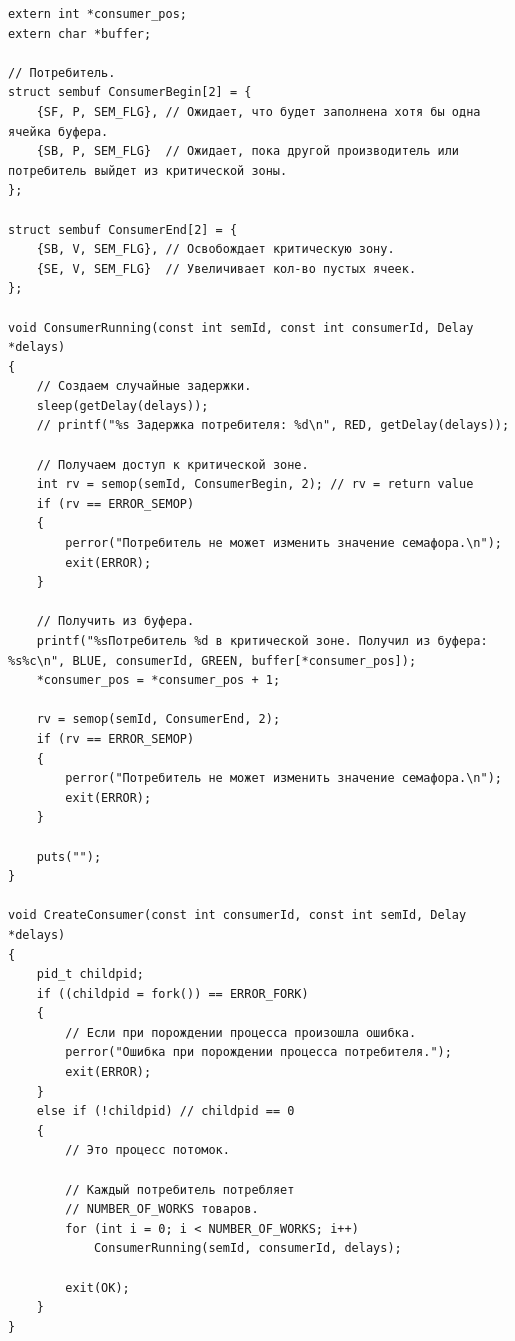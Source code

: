 \begin{lstlisting}[label=some-code,caption=Потребитель]
extern int *consumer_pos;
extern char *buffer;

// Потребитель.
struct sembuf ConsumerBegin[2] = {
	{SF, P, SEM_FLG}, // Ожидает, что будет заполнена хотя бы одна ячейка буфера.
	{SB, P, SEM_FLG}  // Ожидает, пока другой производитель или потребитель выйдет из критической зоны.
};

struct sembuf ConsumerEnd[2] = {
	{SB, V, SEM_FLG}, // Освобождает критическую зону.
	{SE, V, SEM_FLG}  // Увеличивает кол-во пустых ячеек.
};

void ConsumerRunning(const int semId, const int consumerId, Delay *delays)
{
	// Создаем случайные задержки.
	sleep(getDelay(delays));
	// printf("%s Задержка потребителя: %d\n", RED, getDelay(delays));

	// Получаем доступ к критической зоне.
	int rv = semop(semId, ConsumerBegin, 2); // rv = return value
	if (rv == ERROR_SEMOP)
	{
		perror("Потребитель не может изменить значение семафора.\n");
		exit(ERROR);
	}

	// Получить из буфера.
	printf("%sПотребитель %d в критической зоне. Получил из буфера: %s%c\n", BLUE, consumerId, GREEN, buffer[*consumer_pos]);
	*consumer_pos = *consumer_pos + 1;

	rv = semop(semId, ConsumerEnd, 2);
	if (rv == ERROR_SEMOP)
	{
		perror("Потребитель не может изменить значение семафора.\n");
		exit(ERROR);
	}

	puts("");
}

void CreateConsumer(const int consumerId, const int semId, Delay *delays)
{
	pid_t childpid;
	if ((childpid = fork()) == ERROR_FORK)
	{
		// Если при порождении процесса произошла ошибка.
		perror("Ошибка при порождении процесса потребителя.");
		exit(ERROR);
	}
	else if (!childpid) // childpid == 0
	{
		// Это процесс потомок.

		// Каждый потребитель потребляет
		// NUMBER_OF_WORKS товаров.
		for (int i = 0; i < NUMBER_OF_WORKS; i++)
			ConsumerRunning(semId, consumerId, delays);

		exit(OK);
	}
}

\end{lstlisting}

